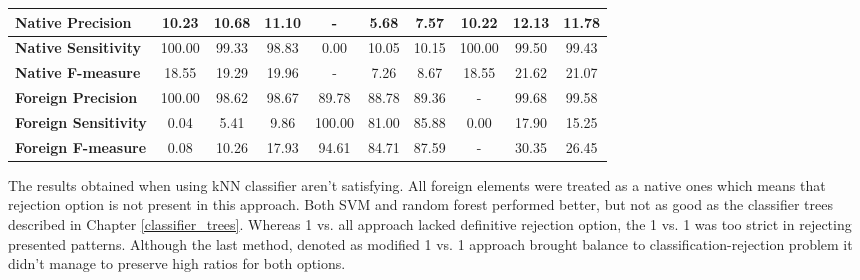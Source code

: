 \begin{table}[htp]
{\begin{tabular}{l|c|c|c|c|c|c|c|c|c|}
	\multicolumn{1}{|l|}{\textbf{Native Precision}}          & 10.23                             & 10.68                             & 11.10                            & -                                 & 5.68                              & 7.57                             & 10.22                             & 12.13                             & 11.78                            \\ \hline
	\multicolumn{1}{|l|}{\textbf{Native Sensitivity}}        & 100.00                            & 99.33                             & 98.83                            & 0.00                              & 10.05                             & 10.15                            & 100.00                            & 99.50                             & 99.43                            \\ \hline
	\multicolumn{1}{|l|}{\textbf{Native F-measure}}          & 18.55                             & 19.29                             & 19.96                            & -                                 & 7.26                              & 8.67                             & 18.55                             & 21.62                             & 21.07                            \\ \hline
	\multicolumn{1}{|l|}{\textbf{Foreign Precision}}         & 100.00                            & 98.62                             & 98.67                            & 89.78                             & 88.78                             & 89.36                            & -                                 & 99.68                             & 99.58                            \\ \hline
	\multicolumn{1}{|l|}{\textbf{Foreign Sensitivity}}       & 0.04                              & 5.41                              & 9.86                             & 100.00                            & 81.00                             & 85.88                            & 0.00                              & 17.90                             & 15.25                            \\ \hline
	\multicolumn{1}{|l|}{\textbf{Foreign F-measure}}         & 0.08                              & 10.26                             & 17.93                            & 94.61                             & 84.71                             & 87.59                            & -                                 & 30.35                             & 26.45                            \\ \hline
\end{tabular}
}
\end{table}

The results obtained when using kNN classifier aren't satisfying. All foreign elements were treated as a native ones which means that rejection option is not present in this approach. Both SVM and random forest performed better, but not as good as the classifier trees described in Chapter \ref{classifier_trees}. Whereas 1 vs. all approach lacked definitive rejection option, the 1 vs. 1 was too strict in rejecting presented patterns. Although the last method, denoted as modified 1 vs. 1 approach brought balance to classification-rejection problem it didn't manage to preserve high ratios for both options.